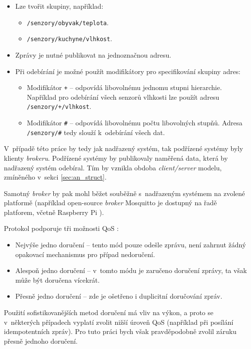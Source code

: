 \begin{itemize}

\item Lze tvořit skupiny, například:
    \begin{itemize}
        \item \verb|/senzory/obyvak/teplota|.
        \item \verb|/senzory/kuchyne/vlhkost|.
    \end{itemize}
\item Zprávy je nutné publikovat na jednoznačnou adresu.
\item Při odebírání je možné použít modifikátory pro specifikování skupiny adres:
    \begin{itemize}
        \item Modifikátor \verb|+| -- odpovídá libovolnému jednomu stupni hierarchie. Například pro odebírání všech senzorů vlhkosti lze použít adresu \verb|/senzory/+/vlhkost|.
        \item Modifikátor \verb|#| -- odpovídá libovolnému počtu libovolných stupňů. Adresa \verb|/senzory/#| tedy slouží k~odebírání všech dat.
    \end{itemize}
\end{itemize}

V~případě této práce by tedy jak nadřazený systém, tak podřízené systémy byly klienty \textit{brokeru}. Podřízené systémy by publikovaly naměřená data, která by nadřazený systém odebíral. Tím by vznikla obdoba \textit{client/server} modelu, zmíněného v~sekci \ref{sec:an_struct}. 

Samotný \textit{broker} by pak mohl běžet souběžně s~nadřazeným systémem na zvolené platformě (například open-source \textit{broker} Mosquitto je dostupný na řadě platforem, včetně Raspberry Pi \cite{mqtt_mosquitto_wiki}).

Protokol podporuje tři možnosti QoS \cite{mqtt_valerie}:

\begin{itemize}
    \item Nejvýše jedno doručení -- tento mód pouze odešle zprávu, není zahrnut žádný opakovací mechanismus pro případ nedoručení.
    \item Alespoň jedno doručení -- v~tomto módu je zaručeno doručení zprávy, ta však může být doručena vícekrát.
    \item Přesně jedno doručení -- zde je ošetřeno i duplicitní doručování zpráv.
\end{itemize}

Použití sofistikovanějších metod doručení má vliv na výkon, a proto se v~některých případech vyplatí zvolit nižší úroveň QoS (například při posílání idempotentních zpráv). Pro tuto práci bych však pravděpodobně zvolil záruku přesně jednoho doručení.

